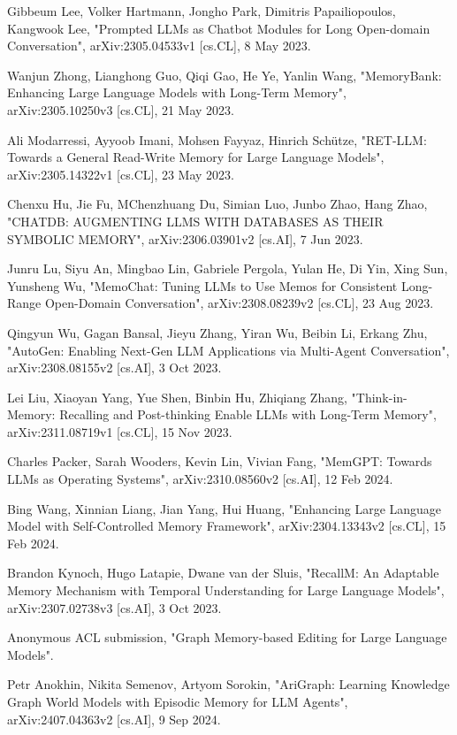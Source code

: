 \documentclass{article}
\begin{document}
\begin{thebibliography}{99}

Gibbeum Lee, Volker Hartmann, Jongho Park, Dimitris Papailiopoulos, Kangwook Lee, 
"Prompted LLMs as Chatbot Modules for Long Open-domain Conversation", 
arXiv:2305.04533v1 [cs.CL], 8 May 2023.

Wanjun Zhong, Lianghong Guo, Qiqi Gao, He Ye, Yanlin Wang, 
"MemoryBank: Enhancing Large Language Models with Long-Term Memory", 
arXiv:2305.10250v3 [cs.CL], 21 May 2023.

Ali Modarressi, Ayyoob Imani, Mohsen Fayyaz, Hinrich Schütze, 
"RET-LLM: Towards a General Read-Write Memory for Large Language Models", 
arXiv:2305.14322v1 [cs.CL], 23 May 2023.

Chenxu Hu, Jie Fu, MChenzhuang Du, Simian Luo, Junbo Zhao, Hang Zhao, 
"CHATDB: AUGMENTING LLMS WITH DATABASES AS THEIR SYMBOLIC MEMORY", 
arXiv:2306.03901v2 [cs.AI], 7 Jun 2023.

Junru Lu, Siyu An, Mingbao Lin, Gabriele Pergola, Yulan He, Di Yin, Xing Sun, Yunsheng Wu,
"MemoChat: Tuning LLMs to Use Memos for Consistent Long-Range Open-Domain Conversation", 
arXiv:2308.08239v2 [cs.CL], 23 Aug 2023.

Qingyun Wu, Gagan Bansal, Jieyu Zhang, Yiran Wu, Beibin Li, Erkang Zhu,
"AutoGen: Enabling Next-Gen LLM Applications via Multi-Agent Conversation", 
arXiv:2308.08155v2 [cs.AI], 3 Oct 2023.

Lei Liu, Xiaoyan Yang, Yue Shen, Binbin Hu, Zhiqiang Zhang,
"Think-in-Memory: Recalling and Post-thinking Enable LLMs with Long-Term Memory", 
arXiv:2311.08719v1 [cs.CL], 15 Nov 2023.

Charles Packer, Sarah Wooders, Kevin Lin, Vivian Fang,
"MemGPT: Towards LLMs as Operating Systems", 
arXiv:2310.08560v2 [cs.AI], 12 Feb 2024.

Bing Wang, Xinnian Liang, Jian Yang, Hui Huang,
"Enhancing Large Language Model with Self-Controlled Memory Framework", 
arXiv:2304.13343v2 [cs.CL], 15 Feb 2024.

Brandon Kynoch, Hugo Latapie, Dwane van der Sluis,
"RecallM: An Adaptable Memory Mechanism with Temporal Understanding for Large Language Models", 
arXiv:2307.02738v3 [cs.AI], 3 Oct 2023.

Anonymous ACL submission,
"Graph Memory-based Editing for Large Language Models".

Petr Anokhin, Nikita Semenov, Artyom Sorokin,
"AriGraph: Learning Knowledge Graph World Models with Episodic Memory for LLM Agents", 
arXiv:2407.04363v2 [cs.AI], 9 Sep 2024.

\end{thebibliography}
\end{document}
